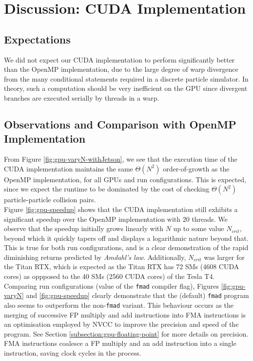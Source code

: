 \documentclass[12pt]{article}
\begin{document}
\pagebreak

\section{Discussion: CUDA Implementation}

\subsection{Expectations}
We did not expect our CUDA implementation to perform significantly better than the OpenMP implementation, due to the large degree of warp divergence from the many conditional statements required in a discrete particle simulator. In theory, such a computation should be very inefficient on the GPU since divergent branches are executed serially by threads in a warp.

\subsection{Observations and Comparison with OpenMP Implementation}

From Figure \ref{fig:gpu-varyN-withJetson}, we see that the execution time of the CUDA implementation maintains the same $\Theta(N^2)$ order-of-growth as the OpenMP implementation, for all GPUs and run configurations. This is expected, since we expect the runtime to be dominated by the cost of checking $\Theta(N^2)$ particle-particle collision pairs.\\

Figure \ref{fig:gpu-speedup} shows that the CUDA implementation still exhibits a significant speedup over the OpenMP implementation with 20 threads. We observe that the speedup initially grows linearly with $N$ up to some value $N_{crit}$, beyond which it quickly tapers off and displays a logarithmic nature beyond that. This is true for both run configurations, and is a clear demonstration of the rapid diminishing returns predicted by \textit{Amdahl's law}. Additionally, $N_{crit}$ was larger for the Titan RTX, which is expected as the Titan RTX has 72 SMs (4608 CUDA cores) as oppposed to the 40 SMs (2560 CUDA cores) of the Tesla T4.\\

Comparing run configurations (value of the \texttt{fmad} compiler flag), Figures \ref{fig:gpu-varyN} and \ref{fig:gpu-speedup} clearly demonstrate that the (default) \texttt{fmad} program also seems to outperform the non-\texttt{fmad} variant. This behaviour occurs as the merging of successive FP multiply and add instructions into FMA instructions is an optimisation employed by NVCC to improve the precision and speed of the program. See Section \ref{subsection:gpu-floating-point} for more details on precision. FMA instructions coalesce a FP multiply and an add instruction into a single instruction, saving clock cycles in the process. \\
\end{document}
